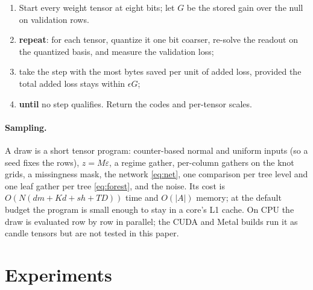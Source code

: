\begin{algo}[t]
\caption{Rate--distortion bit allocation with error feedback.}
\label{alg:bits}
\small
\begin{enumerate}[leftmargin=2em,itemsep=1pt,topsep=3pt,label=\arabic*:]
\item Start every weight tensor at eight bits; let $G$ be the stored gain over the null on validation rows.
\item \textbf{repeat}: for each tensor, quantize it one bit coarser, re-solve the readout on the quantized basis,
  and measure the validation loss;
\item \hspace{1.2em}take the step with the most bytes saved per unit of added loss, provided the total added loss stays within $\epsilon G$;
\item \textbf{until} no step qualifies. Return the codes and per-tensor scales.
\end{enumerate}
\end{algo}

\paragraph{Sampling.}
A draw is a short tensor program: counter-based normal and uniform inputs (so a seed fixes the rows), $z=M\varepsilon$, a regime gather, per-column gathers on the knot grids, a
missingness mask, the network \eqref{eq:net}, one comparison per tree level and one leaf gather per
tree \eqref{eq:forest}, and the noise. Its cost is $O(N(dm+Kd+sh+TD))$ time and $O(|A|)$ memory; at the default budget the program is small enough to stay in a core's L1 cache.
On CPU the draw is evaluated row by row in parallel; the CUDA and Metal builds run it as candle tensors
but are not tested in this paper.

\section{Experiments}
\label{sec:experiments}

